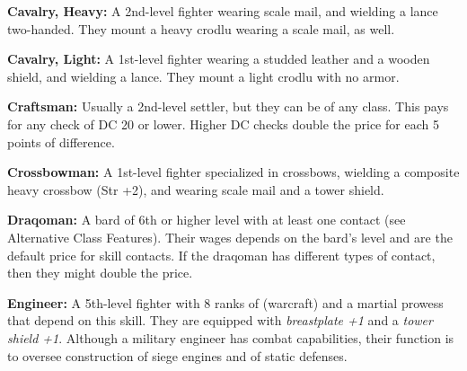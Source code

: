 \textbf{Cavalry, Heavy:} A 2nd-level fighter wearing scale mail, and wielding a lance two-handed. They mount a heavy crodlu wearing a scale mail, as well.

\textbf{Cavalry, Light:} A 1st-level fighter wearing a studded leather and a wooden shield, and wielding a lance. They mount a light crodlu with no armor.

\textbf{Craftsman:} Usually a 2nd-level settler, but they can be of any class. This pays for any  check of DC 20 or lower. Higher DC checks double the price for each 5 points of difference. 

\textbf{Crossbowman:} A 1st-level fighter specialized in crossbows, wielding a composite heavy crossbow (Str +2), and wearing scale mail and a tower shield.

\textbf{Draqoman:} A bard of 6th or higher level with at least one contact (see Alternative Class Features). Their wages depends on the bard's level and are the default price for skill contacts. If the draqoman has different types of contact, then they might double the price.

\textbf{Engineer:} A 5th-level fighter with 8 ranks of  (warcraft) and a martial prowess that depend on this skill. They are equipped with \emph{breastplate +1} and a \emph{tower shield +1}. Although a military engineer has combat capabilities, their function is to oversee construction of siege engines and of static defenses.


